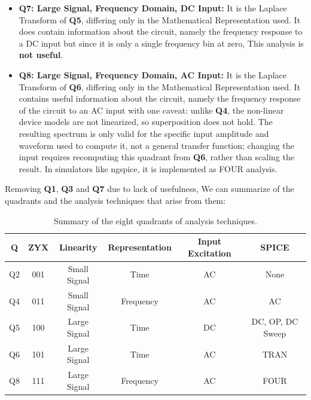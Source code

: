 \begin{itemize}
      technique. In simulators like ngspice, it is implemented as TRAN
      analysis.
    \item \textbf{Q7: Large Signal, Frequency Domain, DC Input:}
      It is the Laplace Transform of \textbf{Q5}, differing only in the
      Mathematical Representation used. It does contain information about
      the circuit, namely the frequency response to a DC input but since
      it is only a single frequency bin at zero, This analysis is
      \textbf{not useful}.
    \item \textbf{Q8: Large Signal, Frequency Domain, AC Input:}
      It is the Laplace Transform of \textbf{Q6},
      differing only in the Mathematical Representation used. It contains
      useful information about the circuit, namely the frequency response
      of the circuit to an AC input with one caveat: unlike
      \textbf{Q4}, the non-linear device models are not
      linearized, so superposition does not hold. The resulting spectrum
      is only valid for the specific input amplitude and waveform used to
      compute it, not a general transfer function; changing the input
      requires recomputing this quadrant from \textbf{Q6},
      rather than scaling the result. In simulators like ngspice, it is
      implemented as FOUR analysis.
\end{itemize}

Removing \textbf{Q1}, \textbf{Q3} and \textbf{Q7} due to lack of usefulness,
We can summarize of the quadrants and the analysis techniques that arise
from them:
\begin{table}[H]
    \centering
    \begin{tabular}{|c|c|c|c|c|c|}\hline
      \textbf{Q} & \textbf{ZYX} & \textbf{Linearity} & \textbf{Representation} & \textbf{Input Excitation} & \textbf{SPICE} \\ \hline
      Q2 & 001 & Small Signal & Time      & AC & None \\ \hline
      Q4 & 011 & Small Signal & Frequency & AC & AC \\ \hline
      Q5 & 100 & Large Signal & Time      & DC & DC, OP, DC Sweep \\ \hline
      Q6 & 101 & Large Signal & Time      & AC & TRAN \\ \hline
      Q8 & 111 & Large Signal & Frequency & AC & FOUR \\ \hline
    \end{tabular}
    \caption{Summary of the eight quadrants of analysis techniques.}\label{tab:quadrant-summary}
\end{table}

